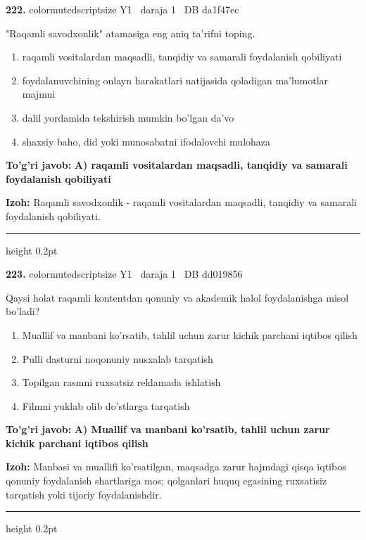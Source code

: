 \documentclass[10pt,a4paper,oneside]{article}
\begin{document}
\noindent\textbf{\color{ink}222.}  {color{muted}scriptsize Y1 \textbullet\ daraja 1 \textbullet\ DB da1f47ec}
\par
"Raqamli savodxonlik" atamasiga eng aniq ta'rifni toping.
\begin{enumerate}[label=\Alph*),leftmargin=9mm]
\item raqamli vositalardan maqsadli, tanqidiy va samarali foydalanish qobiliyati
\item foydalanuvchining onlayn harakatlari natijasida qoladigan ma'lumotlar majmui
\item dalil yordamida tekshirish mumkin bo'lgan da'vo
\item shaxsiy baho, did yoki munosabatni ifodalovchi mulohaza
\end{enumerate}
\begin{tcolorbox}[enhanced,breakable,colback=teal!4,colframe=teal!50!black,boxrule=0.5pt,arc=1.1mm,left=3mm,right=3mm,top=1.7mm,bottom=1.7mm,before skip=2mm,after skip=2mm]
\textbf{\color{teal}To'g'ri javob:} \textbf{A) raqamli vositalardan maqsadli, tanqidiy va samarali foydalanish qobiliyati}
\par\smallskip
\textbf{Izoh:} Raqamli savodxonlik - raqamli vositalardan maqsadli, tanqidiy va samarali foydalanish qobiliyati.
\end{tcolorbox}
\vspace{2mm}\hrule height 0.2pt \vspace{3mm}

\noindent\textbf{\color{ink}223.}  {color{muted}scriptsize Y1 \textbullet\ daraja 1 \textbullet\ DB dd019856}
\par
Qaysi holat raqamli kontentdan qonuniy va akademik halol foydalanishga misol bo'ladi?
\begin{enumerate}[label=\Alph*),leftmargin=9mm]
\item Muallif va manbani ko'rsatib, tahlil uchun zarur kichik parchani iqtibos qilish
\item Pulli dasturni noqonuniy nusxalab tarqatish
\item Topilgan rasmni ruxsatsiz reklamada ishlatish
\item Filmni yuklab olib do'stlarga tarqatish
\end{enumerate}
\begin{tcolorbox}[enhanced,breakable,colback=teal!4,colframe=teal!50!black,boxrule=0.5pt,arc=1.1mm,left=3mm,right=3mm,top=1.7mm,bottom=1.7mm,before skip=2mm,after skip=2mm]
\textbf{\color{teal}To'g'ri javob:} \textbf{A) Muallif va manbani ko'rsatib, tahlil uchun zarur kichik parchani iqtibos qilish}
\par\smallskip
\textbf{Izoh:} Manbasi va muallifi ko'rsatilgan, maqsadga zarur hajmdagi qisqa iqtibos qonuniy foydalanish shartlariga mos; qolganlari huquq egasining ruxsatisiz tarqatish yoki tijoriy foydalanishdir.
\end{tcolorbox}
\vspace{2mm}\hrule height 0.2pt \vspace{3mm}
\end{document}
